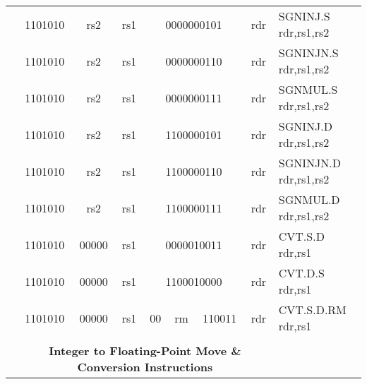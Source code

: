 \begin{table}[p]
\begin{small}
\begin{center}
\begin{tabular}{rcccccccccccl}
&
\multicolumn{2}{|c|}{1101010} &
\multicolumn{1}{c|}{rs2} &
\multicolumn{1}{c|}{rs1} &
\multicolumn{6}{c|}{0000000101} &
\multicolumn{1}{c|}{rdr} & SGNINJ.S rdr,rs1,rs2 \\
\cline{2-12}
  

&
\multicolumn{2}{|c|}{1101010} &
\multicolumn{1}{c|}{rs2} &
\multicolumn{1}{c|}{rs1} &
\multicolumn{6}{c|}{0000000110} &
\multicolumn{1}{c|}{rdr} & SGNINJN.S rdr,rs1,rs2 \\
\cline{2-12}
  

&
\multicolumn{2}{|c|}{1101010} &
\multicolumn{1}{c|}{rs2} &
\multicolumn{1}{c|}{rs1} &
\multicolumn{6}{c|}{0000000111} &
\multicolumn{1}{c|}{rdr} & SGNMUL.S rdr,rs1,rs2 \\
\cline{2-12}
  

&
\multicolumn{2}{|c|}{1101010} &
\multicolumn{1}{c|}{rs2} &
\multicolumn{1}{c|}{rs1} &
\multicolumn{6}{c|}{1100000101} &
\multicolumn{1}{c|}{rdr} & SGNINJ.D rdr,rs1,rs2 \\
\cline{2-12}
  

&
\multicolumn{2}{|c|}{1101010} &
\multicolumn{1}{c|}{rs2} &
\multicolumn{1}{c|}{rs1} &
\multicolumn{6}{c|}{1100000110} &
\multicolumn{1}{c|}{rdr} & SGNINJN.D rdr,rs1,rs2 \\
\cline{2-12}
  

&
\multicolumn{2}{|c|}{1101010} &
\multicolumn{1}{c|}{rs2} &
\multicolumn{1}{c|}{rs1} &
\multicolumn{6}{c|}{1100000111} &
\multicolumn{1}{c|}{rdr} & SGNMUL.D rdr,rs1,rs2 \\
\cline{2-12}
  

&
\multicolumn{2}{|c|}{1101010} &
\multicolumn{1}{c|}{00000} &
\multicolumn{1}{c|}{rs1} &
\multicolumn{6}{c|}{0000010011} &
\multicolumn{1}{c|}{rdr} & CVT.S.D rdr,rs1 \\
\cline{2-12}
  

&
\multicolumn{2}{|c|}{1101010} &
\multicolumn{1}{c|}{00000} &
\multicolumn{1}{c|}{rs1} &
\multicolumn{6}{c|}{1100010000} &
\multicolumn{1}{c|}{rdr} & CVT.D.S rdr,rs1 \\
\cline{2-12}
  

&
\multicolumn{2}{|c|}{1101010} &
\multicolumn{1}{c|}{00000} &
\multicolumn{1}{c|}{rs1} &
\multicolumn{1}{c|}{00} &
\multicolumn{2}{c|}{rm} &
\multicolumn{3}{c|}{110011} &
\multicolumn{1}{c|}{rdr} & CVT.S.D.RM rdr,rs1 \\
\cline{2-12}
  

&
\multicolumn{11}{c}{} & \\
&
\multicolumn{11}{c}{\bf Integer to Floating-Point Move \& Conversion Instructions} & \\
\cline{2-12}
  


\end{tabular}
\end{center}
\end{small}
\end{table}
